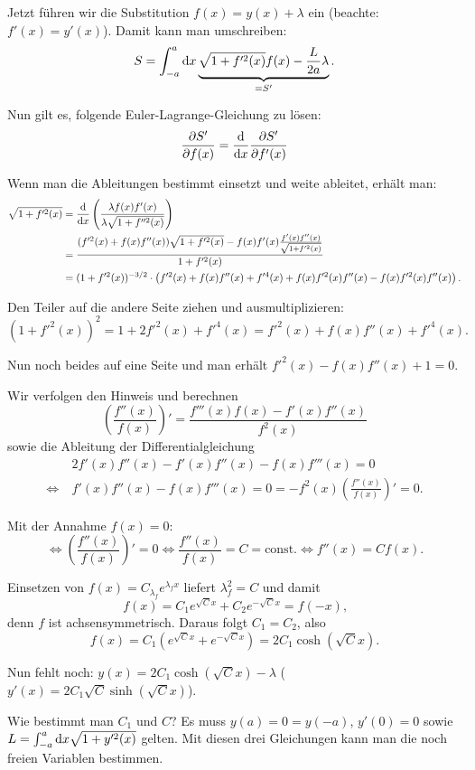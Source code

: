 Jetzt führen wir die Substitution $f(x) = y(x) + \lambda$ ein (beachte: $f'(x) = y'(x)$). Damit kann man umschreiben:
\[
	S = \int^a_{-a} \mathrm{d} x \underbrace{\sqrt{1 + f'^2(x)} f(x) - \frac{L}{2a} \lambda}_{= S'}
	\text{.}
\]

Nun gilt es, folgende Euler-Lagrange-Gleichung zu lösen:
\[
	\frac{\partial S'}{\partial f(x)} = \frac{\mathrm{d}}{\mathrm{d}x} \frac{\partial S'}{\partial f'(x)}
\]

Wenn man die Ableitungen bestimmt einsetzt und weite ableitet, erhält man:
\begin{align*}
	\sqrt{1 + f'^2(x)} 
	&= \frac{\mathrm{d}}{\mathrm{d}x} \left( \frac{\lambda f(x) f'(x)}{\lambda \sqrt{1 + f''^2(x)}} \right) \\
	&= \frac{(f'^2(x) + f(x) f''(x)) \sqrt{1 + f'^2(x)} - f(x) f'(x) \frac{f'(x) f''(x)}{\sqrt{1 + f'^2(x)}}}{1 + f'^2(x)} \\
	&= (1 + f'^2(x))^{-3/2} \cdot \left( f'^2(x) + f(x) f''(x) + f'^4(x) + f(x) f'^2(x) f''(x) - f(x) f'^2(x) f''(x) \right)
	\text{.}
\end{align*}

Den Teiler auf die andere Seite ziehen und ausmultiplizieren:
\[
	(1 + f'^2(x))^2 = 1 + 2 f'^2(x) + f'^4(x) = f'^2(x) + f(x) f''(x) + f'^4(x)
	\text{.}
\]

Nun noch beides auf eine Seite und man erhält $f'^2(x) - f(x) f''(x) + 1 = 0$.

Wir verfolgen den Hinweis und berechnen
\[
	\left( \frac{f''(x)}{f(x)} \right)' = \frac{f'''(x) f(x) - f'(x) f''(x)}{f^2(x)}
\]
sowie die Ableitung der Differentialgleichung
\begin{align*}
	&~ 2f'(x) f''(x) - f'(x) f''(x) - f(x) f'''(x) = 0 \\
	\Longleftrightarrow &~ f'(x) f''(x) - f(x) f'''(x) = 0 = -f^2(x) \left( \frac{f''(x)}{f(x)} \right)' = 0
	\text{.}
\end{align*}

Mit der Annahme $f(x) = 0$:
\[
	\Longleftrightarrow \left( \frac{f''(x)}{f(x)} \right)' = 0 \Longleftrightarrow \frac{f''(x)}{f(x)} = C = \text{const}. \Longleftrightarrow f''(x) = C f(x)
	\text{.}
\]

Einsetzen von $f(x) = C_{\lambda_f} e^{\lambda_f x}$ liefert $\lambda_f^2 = C$ und damit 
\[
	f(x) = C_1 e^{\sqrt{C}x} + C_2 e^{-\sqrt{C} x} = f(-x)
	\text{,}
\]
denn $f$ ist achsensymmetrisch. Daraus folgt $C_1 = C_2$, also 
\[
	f(x) = C_1 \left( e^{\sqrt{C} x} + e^{- \sqrt{C} x} \right) = 2 C_1 \cosh (\sqrt{C} x)
	\text{.}
\]

Nun fehlt noch: $y(x) = 2 C_1 \cosh(\sqrt{C} x) - \lambda$ ($y'(x) = 2 C_1 \sqrt{C} \sinh(\sqrt{C} x)$).

Wie bestimmt man $C_1$ und $C$? Es muss $y(a) = 0 = y(-a)$, $y'(0) = 0$ sowie $L = \int^a_{-a} \mathrm{d} x \sqrt{1 + y'^2(x)}$ gelten. Mit diesen drei Gleichungen kann man die noch freien Variablen bestimmen.